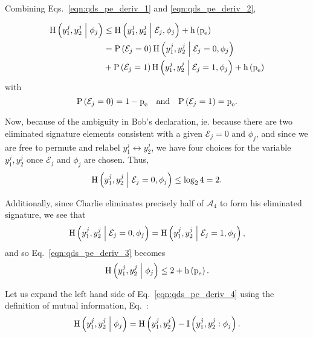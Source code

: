 Combining Eqs.~\ref{eqn:qds_pe_deriv_1} and \ref{eqn:qds_pe_deriv_2},

\begin{align}\label{eqn:qds_pe_deriv_3}
\text{H}\left(y_1^j, y_2^j \; \middle| \; \phi_j\right) &\le \text{H}\left(y_1^j, y_2^j \; \middle| \; \mathcal{E}_j, \phi_j\right) + \text{h}\left(\text{p}_{\text{e}}\right) \notag \\
&= \text{P}\left(\mathcal{E}_j=0\right) \text{H}\left(y_1^j, y_2^j \; \middle| \; \mathcal{E}_j=0, \phi_j\right) \notag \\
&+ \text{P}\left(\mathcal{E}_j=1\right) \text{H}\left(y_1^j, y_2^j \; \middle| \; \mathcal{E}_j=1, \phi_j\right) + \text{h}\left(\text{p}_{\text{e}}\right)
\end{align}
with
\begin{equation}
\text{P}\left(\mathcal{E}_j=0\right) = 1 - \pe \qq{and} \text{P}\left(\mathcal{E}_j=1\right) = \pe.
\end{equation}

\noindent Now, because of the ambiguity in Bob's declaration, ie. because there are two eliminated signature elements consistent with a given $\mathcal{E}_j=0$ and $\phi_j$, and since we are free to permute and relabel $y_1^j \leftrightarrow y_2^j$, we have four choices for the variable $y_1^j, y_2^j$ once $\mathcal{E}_j$ and $\phi_j$ are chosen. Thus,
\begin{equation}
\text{H}\left(y_1^j, y_2^j \; \middle| \; \mathcal{E}_j=0, \phi_j\right) \le \log_2 4 = 2.
\end{equation}

\noindent Additionally, since Charlie eliminates precisely half of $\mathcal{A}_4$ to form his eliminated signature, we see that
\begin{equation}
\text{H}\left(y_1^j, y_2^j \; \middle| \; \mathcal{E}_j=0, \phi_j\right) = \text{H}\left(y_1^j, y_2^j \; \middle| \; \mathcal{E}_j=1, \phi_j\right),
\end{equation}
and so Eq.~\ref{eqn:qds_pe_deriv_3} becomes
\begin{equation}\label{eqn:qds_pe_deriv_4}
\text{H}\left(y_1^j, y_2^j \; \middle| \; \phi_j\right) \le 2 + \text{h}\left(\text{p}_{\text{e}}\right).
\end{equation}

\noindent Let us expand the left hand side of Eq.~\ref{eqn:qds_pe_deriv_4} using the definition of mutual information, Eq.~:
\begin{equation}\label{eqn:qds_pe_deriv_5}
\text{H}\left(y_1^j, y_2^j \; \middle| \; \phi_j\right) = \text{H}\left(y_1^j, y_2^j\right) - \text{I}\left(y_1^j, y_2^j : \phi_j\right).
\end{equation}

